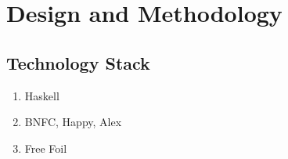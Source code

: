 \chapter{Design and Methodology}
\label{chap:methodology}





% 


\section{Technology Stack}

\begin{enumerate}
  \item Haskell
  \item BNFC, Happy, Alex
  \item Free Foil
\end{enumerate}
